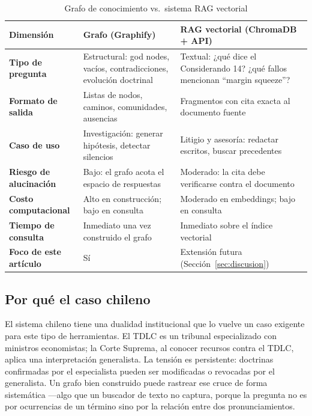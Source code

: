 \documentclass[12pt,a4paper]{article}
\begin{document}
\begin{table}[h!]
\centering
\caption{Grafo de conocimiento vs.\ sistema RAG vectorial}
\label{tab:grafo-vs-rag}
\small
\begin{tabularx}{\linewidth}{>{\bfseries}p{3.3cm} X X}
\toprule
\rowcolor{tabhead}\color{white}\textbf{Dimensión} &
  \color{white}\textbf{Grafo (Graphify)} &
  \color{white}\textbf{RAG vectorial (ChromaDB + API)} \\
\midrule
Tipo de pregunta &
  Estructural: god nodes, vacíos, contradicciones, evolución doctrinal &
  Textual: ¿qué dice el Considerando 14? ¿qué fallos mencionan ``margin squeeze''? \\
\addlinespace
Formato de salida &
  Listas de nodos, caminos, comunidades, ausencias &
  Fragmentos con cita exacta al documento fuente \\
\addlinespace
Caso de uso &
  Investigación: generar hipótesis, detectar silencios &
  Litigio y asesoría: redactar escritos, buscar precedentes \\
\addlinespace
Riesgo de alucinación &
  Bajo: el grafo acota el espacio de respuestas &
  Moderado: la cita debe verificarse contra el documento \\
\addlinespace
Costo computacional &
  Alto en construcción; bajo en consulta &
  Moderado en embeddings; bajo en consulta \\
\addlinespace
Tiempo de consulta &
  Inmediato una vez construido el grafo &
  Inmediato sobre el índice vectorial \\
\addlinespace
Foco de este artículo &
  Sí &
  Extensión futura (Sección~\ref{sec:discusion}) \\
\bottomrule
\end{tabularx}
\end{table}

\subsection{Por qué el caso chileno}

El sistema chileno tiene una dualidad institucional que lo vuelve un caso
exigente para este tipo de herramientas. El TDLC es un tribunal especializado
con ministros economistas; la Corte Suprema, al conocer recursos contra el TDLC,
aplica una interpretación generalista. La tensión es persistente: doctrinas
confirmadas por el especialista pueden ser modificadas o revocadas por el
generalista. Un grafo bien construido puede rastrear ese cruce de
forma sistemática —algo que un buscador de texto no captura, porque la pregunta
no es por ocurrencias de un término sino por la relación entre dos
pronunciamientos.
\end{document}
